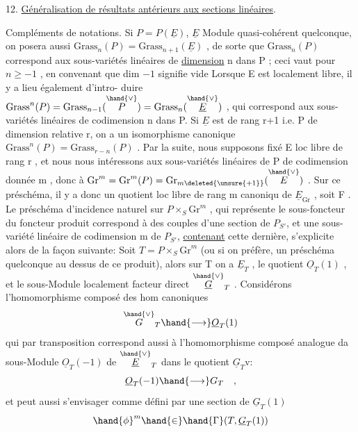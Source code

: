 
12. \uline{Généralisation de résultats antérieurs aux sections linéaires}.

Compléments de notations. Si $P = P(\underline{E})$, $\underline{E}$ Module quasi-cohérent
quelconque, on posera aussi $\mathrm{Grass}_n(P) = \mathrm{Grass}_{n+1}(\underline{E})$ , de sorte que
$\mathrm{Grass}_n(P)$ correspond aux sous-variétés linéaires de \uline{dimension} n dans
P ; ceci vaut pour $n \geq -1$ , en convenant que dim $-1$ signifie vide
Lorsque E est localement libre,  il y a lieu également d'intro-%
duire $\mathrm{Grass}^n(P) = \mathrm{Grass}_{n-1}(\overset{\hand{\vee}}{P}) = \mathrm{Grass}_n(\overset{\hand{\vee}}{\underline{E}})$ , qui correspond aux sous-%
variétés linéaires de codimension n dans P. Si $\underline{E}$ est de rang r+1 i.e.
P de dimension relative r, on a un isomorphisme canonique
$\mathrm{Grass}^n(P) = \mathrm{Grass}_{r-n}(P)$ . Par la suite, nous supposons fixé E loc
libre de rang r , et nous nous intéressons aux sous-variétés linéaires
de P de codimension donnée m , donc à $\mathrm{Gr}^m = \mathrm{Gr}^m(P) = \mathrm{Gr}_{m\deleted{\unsure{+1}}}(\overset{\hand{\vee}}{E})$ .
Sur ce préschéma, il y a donc un quotient  loc libre de rang m canoniqu
de $\underline{E}_{\mathrm{Gr}}$ , soit F .  Le préschéma d'incidence naturel
sur $P\times_S \mathrm{Gr}^m$ , qui représente le sous-foncteur du foncteur produit
correspond à des couples d'une section de $P_{S'}$, et une sous-variété
linéaire de codimension m de $P_{S'}$, \uline{contenant} cette dernière, s'explicite
alors de la façon suivante: Soit $T=P\times_S \mathrm{Gr}^m$ (ou si on préfère, un
préschéma quelconque au dessus de ce produit), alors sur  T on a
$\underline{E}_T$ , le quotient $\underline{O}_T(1)$ , et le sous-Module localement facteur direct
$\overset{\hand{\vee}}{\underline{G}}_T$ . Considérons l'homomorphisme composé des hom canoniques
\[ \overset{\hand{\vee}}{G}_T \hand{\longrightarrow} \underline{O}_T(1) \]
qui par transposition correspond aussi à l'homomorphisme composé
analogue da sous-Module $\underline{O}_T(-1)$ de $\overset{\hand{\vee}}{\underline{E}}_T$ dans le quotient $\underline{G}_T\mathrm{v}$:
\[ \underline{O}_T(-1) \hand{\longrightarrow} G_T \quad , \]
et peut aussi s'envisager comme défini par une section de $\underline{G}_T(1)$
\[ \hand{\phi}^m \hand{\in} \hand{\Gamma}(T, \underline{G}_T(1)) \]

